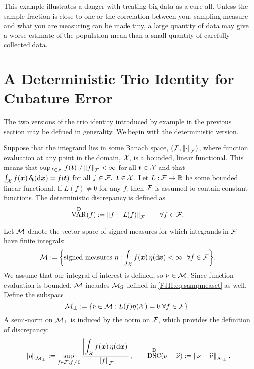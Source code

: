 \documentclass[graybox,footinfo]{svmult}
\DeclareMathOperator{\disc}{DSC}
\DeclareMathOperator{\Var}{VAR}
\begin{document}
This example illustrates a danger with treating big data as a cure all. Unless 
the 
sample fraction is close to one or the correlation between 
your sampling measure and what you are measuring can be made tiny, a large quantity of 
data may give a worse estimate of the population mean than a small quantity of carefully 
collected data.

\begin{FJHLesson}
	\FJHLessonOne
\end{FJHLesson}

\section{A Deterministic Trio Identity for Cubature Error} \label{FJH:sec:dettrio}
The two versions of the trio identity introduced by example in the previous section may 
be defined in generality. We begin with the deterministic version.  

Suppose that the integrand lies in some Banach space, $({\mathcal{F}},\left \lVert \cdot \right \rVert_{{\mathcal{F}}})$, 
where 
function 
evaluation at any point  in the 
domain,  ${\mathcal{X}}$, is a 
bounded, linear functional.  This means that $\sup_{f \in {\mathcal{F}}} 
\bigl \lvert f({\boldsymbol{t}}) \bigr \rvert/\left \lVert f \right \rVert_{{\mathcal{F}}} < 
\infty$ for all ${\boldsymbol{t}} \in {\mathcal{X}}$ and that $\int_{{\mathcal{X}}} f({\boldsymbol{x}}) \, \delta_{{\boldsymbol{t}}}(\mathrm{d}{\boldsymbol{x}}) 
=f({\boldsymbol{t}})$ 
for all $f \in {\mathcal{F}}, \ {\boldsymbol{t}} \in {\mathcal{X}}$.  Let $L :{\mathcal{F}} \to {\mathbb{R}}$ be some bounded 
linear functional.  If $L(f) \ne 0$ for any $f$, then ${\mathcal{F}}$ is assumed to contain  
constant functions.  The deterministic discrepancy is defined as 
\begin{equation}  \label{FJH:eq:detvardef}
\Var^{\Dt}(f) := \norm{f- L(f)}_{\calF} \qquad \forall f \in \calF.
\end{equation} 

Let ${\mathcal{M}}$ denote the vector space of signed measures for which integrands in 
${\mathcal{F}}$ 
have finite integrals:
\begin{equation*}
\calM : = \biggl \{\text{signed measures } \eta : \int_{\calX} f(\bsx) \, \eta(\D\bsx) < \infty \ 
\ 
\forall f \in \calF \biggr \}.
\end{equation*}
We assume that our integral of interest is defined, so $\nu \in {\mathcal{M}}$.  Since function 
evaluation is bounded, ${\mathcal{M}}$ includes ${\mathcal{M}}_{\textup{S}}$ defined in 
\eqref{FJH:eq:sampmeaset} as well.  Define the subspace  
\begin{equation} \label{FJH:eq:Mperpdef}
\calM_\bot : = \left \{\eta \in \calM :  L(f) \eta(\calX) = 0  \ \forall f \in \calF
\right\}.
\end{equation} 
A semi-norm on ${\mathcal{M}}_\bot$ is induced by the norm on ${\mathcal{F}}$, which provides the 
definition of discrepancy:
\begin{equation} \label{FJH:eq:detdiscdef}
\norm{\eta}_{\calM_\bot}  : =\sup_{f \in \calF : f \ne 0} \frac{\displaystyle 
\biggabs{\int_{\calX} 
f(\bsx) \, \eta(\D \bsx)}}{\norm{f}_{\calF}}, \qquad \disc^\Dt(\nu - \hnu) : = \norm{\nu - 
\hnu}_{\calM_\bot}.
\end{equation}
\end{document}
